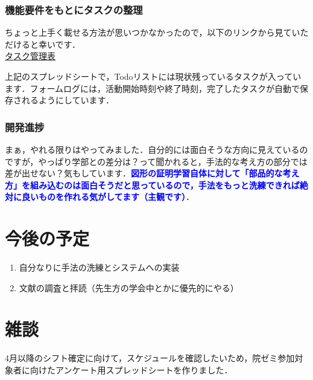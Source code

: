 \documentclass[a4paper,12pt]{ltjsarticle}
\newcommand{\important}[1]{\textcolor{blue}{\textbf{#1}}}
\begin{document}
\subsubsection{機能要件をもとにタスクの整理}
ちょっと上手く載せる方法が思いつかなかったので，以下のリンクから見ていただけると幸いです．\\

\href{https://docs.google.com/spreadsheets/d/1bc6ZpAYn9_rqxhomlmbGAN_Oicu0uma-P-dEPIwMabg/edit?usp=sharing}{タスク管理表}

上記のスプレッドシートで，Todoリストには現状残っているタスクが入っています．フォームログには，活動開始時刻や終了時刻，完了したタスクが自動で保存されるようにしています．

\subsubsection{開発進捗}
まぁ，やれる限りはやってみました．自分的には面白そうな方向に見えているのですが，やっぱり学部との差分は？って聞かれると，手法的な考え方の部分では差が出せない？気もしています．\important{図形の証明学習自体に対して「部品的な考え方」を組み込むのは面白そうだと思っているので，手法をもっと洗練できれば絶対に良いものを作れる気がしてます（主観です）}．
\newpage


\section{今後の予定}
\begin{enumerate}
  \item 自分なりに手法の洗練とシステムへの実装
  \item 文献の調査と拝読（先生方の学会中とかに優先的にやる）
\end{enumerate}

\section*{雑談}
4月以降のシフト確定に向けて，スケジュールを確認したいため，院ゼミ参加対象者に向けたアンケート用スプレッドシートを作りました．\\
\end{document}
